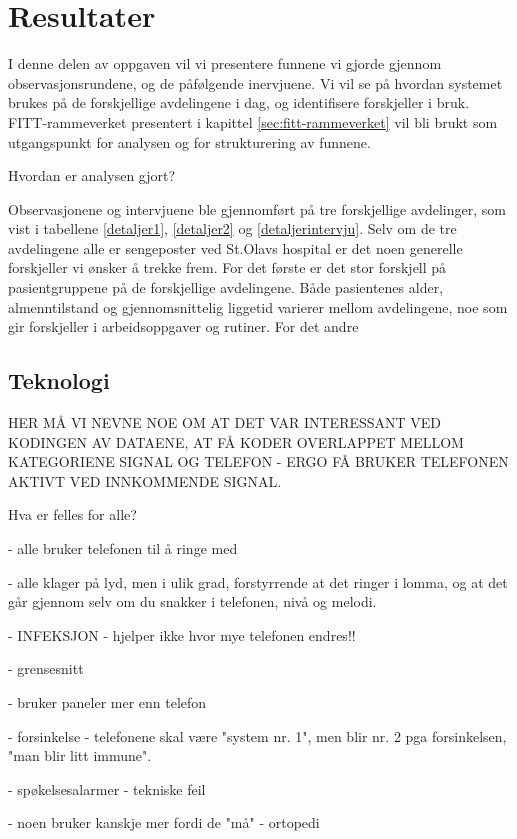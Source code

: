 \chapter{Resultater}
\label{chp:resultater} 

I denne delen av oppgaven vil vi presentere funnene vi gjorde gjennom observasjonsrundene, og de påfølgende inervjuene. Vi vil se på hvordan systemet brukes på de forskjellige avdelingene i dag, og identifisere forskjeller i bruk. FITT-rammeverket presentert i kapittel \ref{sec:fitt-rammeverket} vil bli brukt som utgangspunkt for analysen og for strukturering av funnene.

\noindent
Hvordan er analysen gjort?

\noindent
Observasjonene og intervjuene ble gjennomført på tre forskjellige avdelinger, som vist i tabellene \ref{detaljer1}, \ref{detaljer2} og \ref{detaljerintervju}. Selv om de tre avdelingene alle er sengeposter ved St.Olavs hospital er det noen generelle forskjeller vi ønsker å trekke frem. For det første er det stor forskjell på pasientgruppene på de forskjellige avdelingene. Både pasientenes alder, almenntilstand og gjennomsnittelig liggetid varierer mellom avdelingene, noe som gir forskjeller i arbeidsoppgaver og rutiner. For det andre 

\section{Teknologi}

HER MÅ VI NEVNE NOE OM AT DET VAR INTERESSANT VED KODINGEN AV DATAENE, AT FÅ KODER OVERLAPPET MELLOM KATEGORIENE SIGNAL OG TELEFON - ERGO FÅ BRUKER TELEFONEN AKTIVT VED INNKOMMENDE SIGNAL. 

Hva er felles for alle?

- alle bruker telefonen til å ringe med

- alle klager på lyd, men i ulik grad, forstyrrende at det ringer i lomma, og at det går gjennom selv om du snakker i telefonen, nivå og melodi.

	- INFEKSJON - hjelper ikke hvor mye telefonen endres!!

- grensesnitt

- bruker paneler mer enn telefon 

- forsinkelse - telefonene skal være "system nr. 1", men blir nr. 2 pga forsinkelsen, "man blir litt immune".

- spøkelsesalarmer - tekniske feil

- noen bruker kanskje mer fordi de "må" - ortopedi

